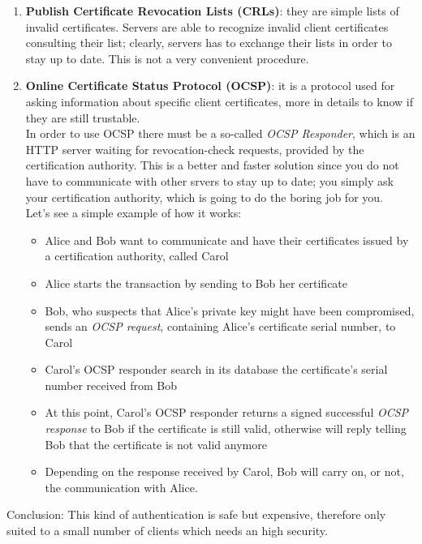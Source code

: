 \documentclass[12pt]{report}
\begin{document}
{\begin{itemize}
\begin{itemize}
\begin{enumerate}
\item \textbf{Publish Certificate Revocation Lists (CRLs)}: they are simple lists of invalid certificates.
Servers are able to recognize invalid client certificates consulting their list; clearly, servers has to exchange their lists in order to stay up to date. This is not a very convenient procedure.
\item \textbf{Online Certificate Status Protocol (OCSP)}:  it is a protocol used for asking information about specific client certificates, more in details to know if they are still trustable.\\
In order to use OCSP there must be a so-called \textit{OCSP Responder}, which is an HTTP server waiting for revocation-check requests, provided by the certification authority.
This is a better and faster solution since you do not have to communicate with other srvers to stay up to date; you simply ask your certification authority, which is going to do the boring job for you.\\
Let's see a simple example of how it works:

\begin{itemize}
\item Alice and Bob want to communicate and have their certificates issued by a certification authority, called Carol
\item Alice starts the transaction by sending to Bob her certificate
\item Bob, who suspects that Alice's private key might have been compromised, sends an \textit{OCSP request}, containing Alice's certificate serial number, to Carol
\item Carol's OCSP responder search in its database the certificate's serial number received from Bob
\item At this point, Carol's OCSP responder returns a signed successful \textit{OCSP response} to Bob if the certificate is still valid, otherwise will reply telling Bob that the certificate is not valid anymore
\item Depending on the response received by Carol, Bob will carry on, or not, the communication with Alice.\\
\end{itemize}


\end{enumerate}
\end{itemize}
\end{itemize}


Conclusion: This kind of authentication is safe but expensive, therefore only suited to a small number of clients which needs an high security. \\

}
\end{document}
